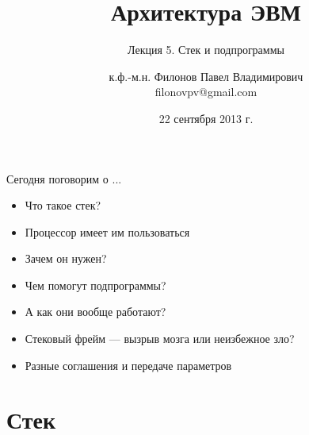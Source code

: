 \documentclass[utf8, russian]{beamer}
\title{Архитектура ЭВМ}
\subtitle{Лекция 5. Стек и подпрограммы}
\author{к.ф.-м.н. Филонов Павел Владимирович \\ filonovpv@gmail.com}
\date{22 сентября 2013 г.}
\institute[МГТУ ГА] 
{
    Московский Государственный Технический Университет \\
    Гражданской Авиации
}
\begin{document}
    \frame{\titlepage}
    \begin{frame}{Сегодня поговорим о ...}
        \begin{itemize}
            \pause
            \item Что такое стек?
            \pause
            \item Процессор имеет им пользоваться
            \pause
            \item Зачем он нужен?
            \pause 
            \item Чем помогут подпрограммы?
            \pause
            \item А как они вообще работают?
            \pause
            \item Стековый фрейм --- вызрыв мозга или неизбежное зло?
            \pause
            \item Разные соглашения и передаче параметров
        \end{itemize}
    \end{frame}
    \section{Стек}
\end{document}
